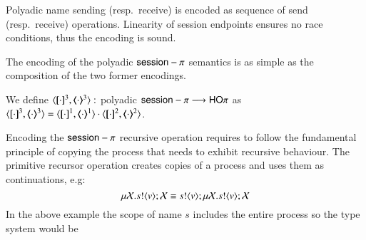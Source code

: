 
Polyadic name sending (resp.\ receive) is encoded as sequence of
send (resp.\ receive) operations. Linearity of session endpoints
ensures no race conditions, thus the encoding is sound.

The encoding of the polyadic $\mathsf{session}-\pi$ semantics is as simple as the
composition of the two former encodings.

\begin{definition}
	We define $\encod{\cdot}{\cdot}{3}: $ polyadic $\mathsf{session}-\pi \longrightarrow \mathsf{HO}\pi$
	as $\encod{\cdot}{\cdot}{3} = \encod{\cdot}{\cdot}{1} \cat \encod{\cdot}{\cdot}{2}$.	
\end{definition}

Encoding the $\mathsf{session}-\pi$ recursive operation requires to follow the fundamental
principle of copying the process that needs to exhibit recursive behaviour.
The primitive recursor operation creates copies of a process and uses them
as continuations, e.g:
\[
	\mu \mathcal{X}. s ! \langle v \rangle ; \mathcal{X} \equiv s ! \langle v \rangle ; \mu \mathcal{X}. s ! \langle v \rangle ; \mathcal{X}
\]
In the above example the scope of name $s$ includes the entire process so
the type system would be 
